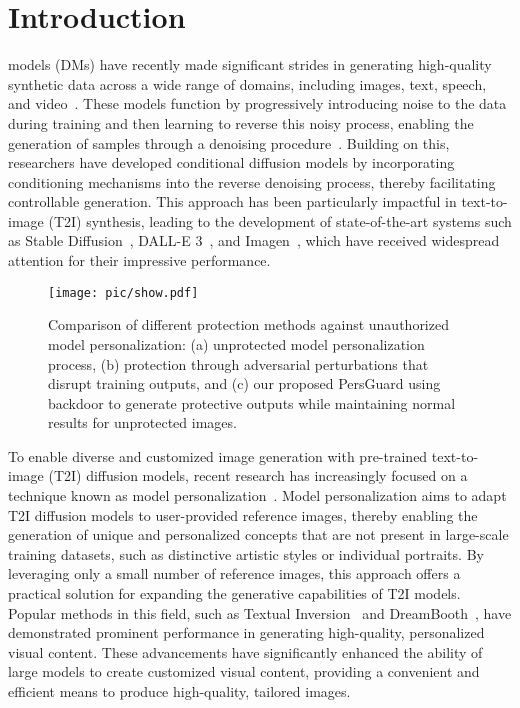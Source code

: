 \section{Introduction}
 models (DMs) have recently made significant strides in generating high-quality synthetic data across a wide range of domains, including images, text, speech, and video~\cite{ho2020denoising, rombach2022high,li2022diffusion,huang2022prodiff,ho2022video}. These models function by progressively introducing noise to the data during training and then learning to reverse this noisy process, enabling the generation of samples through a denoising procedure~\cite{song2020denoising}. Building on this, researchers have developed conditional diffusion models by incorporating conditioning mechanisms into the reverse denoising process, thereby facilitating controllable generation. This approach has been particularly impactful in text-to-image (T2I) synthesis, leading to the development of state-of-the-art systems such as Stable Diffusion~\cite{rombach2022high}, DALL-E 3~\cite{betker2023improving}, and Imagen~\cite{saharia2022photorealistic}, which have received widespread attention for their impressive performance. 

\begin{figure}[t]
  \centering
\texttt{[image: pic/show.pdf]}
  \caption{Comparison of different protection methods against unauthorized model personalization: (a) unprotected model personalization process, (b) protection through adversarial perturbations that disrupt training outputs, and (c) our proposed PersGuard using backdoor to generate protective outputs while maintaining normal results for unprotected images.
} 
  \label{pic:show}
  \vspace{-4mm}
\end{figure}


To enable diverse and customized image generation with pre-trained text-to-image (T2I) diffusion models, recent research has increasingly focused on a technique known as model personalization~\cite{hu2021lora, galimage, ruiz2023dreambooth}. Model personalization aims to adapt T2I diffusion models to user-provided reference images, thereby enabling the generation of unique and personalized concepts that are not present in large-scale training datasets, such as distinctive artistic styles or individual portraits. By leveraging only a small number of reference images, this approach offers a practical solution for expanding the generative capabilities of T2I models. Popular methods in this field, such as Textual Inversion~\cite{galimage} and DreamBooth~\cite{ruiz2023dreambooth}, have demonstrated prominent  performance in generating high-quality, personalized visual content. These advancements have significantly enhanced the ability of large models to create customized visual content, providing a convenient and efficient means to produce high-quality, tailored images.


